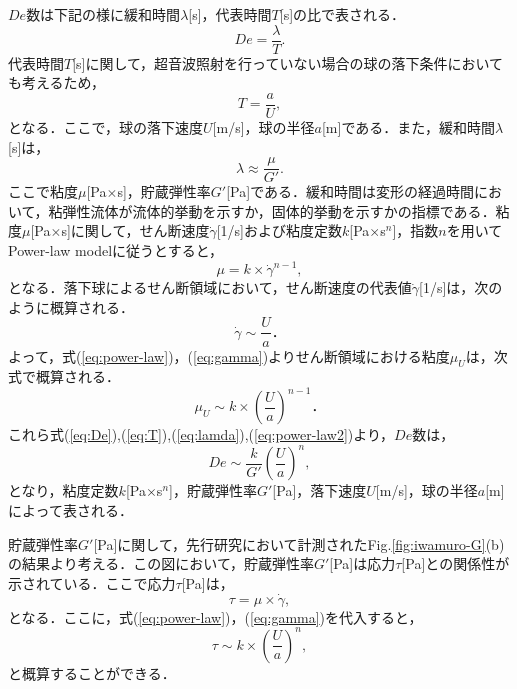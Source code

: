 $De$数は下記の様に緩和時間$\lambda$[s]，代表時間$T$[s]の比で表される．
\begin{equation}
    De = \frac{\lambda}{T} .
    \label{eq:De}
\end{equation}
代表時間$T$[s]に関して，超音波照射を行っていない場合の球の落下条件においても考えるため，
\begin{equation}
    T = \frac{a}{U} ,
    \label{eq:T}
\end{equation}
となる．ここで，球の落下速度$U$[m/s]，球の半径$a$[m]である．また，緩和時間$\lambda$[s]は，
\begin{equation}
    \lambda \approx \frac{\mu}{G'} .
    \label{eq:lamda}
\end{equation}
ここで粘度$\mu$[Pa$\times$s]，貯蔵弾性率$G'$[Pa]である．緩和時間は変形の経過時間において，粘弾性流体が流体的挙動を示すか，固体的挙動を示すかの指標である\cite{ref:sakanishi}．粘度$\mu$[Pa$\times$s]に関して，せん断速度$\dot{\gamma}$[1/s]および粘度定数$k$[Pa$\times$s${}^n$]，指数$n$を用いてPower-law modelに従うとすると，
\begin{equation}
    \mu = k \times \dot{\gamma}^{n-1} ,
    \label{eq:power-law}
\end{equation}
となる．落下球によるせん断領域において，せん断速度の代表値$\dot{\gamma}$[1/s]は，次のように概算される．
\begin{equation}
    \dot{\gamma} \sim \frac{U}{a} ．
    \label{eq:gamma}
\end{equation}
よって，式(\ref{eq:power-law})，(\ref{eq:gamma})よりせん断領域における粘度$\mu_U$は，次式で概算される．
\begin{equation}
    \mu_U \sim k \times \left(\frac{U}{a}\right)^{n-1} ．
    \label{eq:power-law2}
\end{equation}
これら式(\ref{eq:De}),(\ref{eq:T}),(\ref{eq:lamda}),(\ref{eq:power-law2})より，$De$数は，
\begin{equation}
    De \sim \frac{k}{G'} {\left(\frac{U}{a}\right)}^n ,
    \label{eq:De2}
\end{equation}
となり，粘度定数$k$[Pa$\times$s${}^n$]，貯蔵弾性率$G'$[Pa]，落下速度$U$[m/s]，球の半径$a$[m]によって表される．

貯蔵弾性率$G'$[Pa]に関して，先行研究において計測されたFig.\ref{fig:iwamuro-G}(b)の結果より考える．この図において，貯蔵弾性率$G'$[Pa]は応力$\tau$[Pa]との関係性が示されている．ここで応力$\tau$[Pa]は，
\begin{equation}
    \tau = \mu \times \dot{\gamma} ,
    \label{eq:tau}
\end{equation}
となる．ここに，式(\ref{eq:power-law})，(\ref{eq:gamma})を代入すると，
\begin{equation}
    \tau \sim k \times \left(\frac{U}{a}\right)^n ,
    \label{eq:tau-cal}
\end{equation}
と概算することができる．


